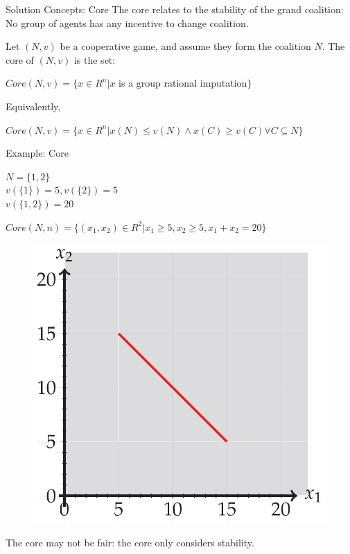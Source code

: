 \documentclass{beamer}
\begin{document}
\begin{frame} {Solution Concepts: Core}
    The core relates to the stability of the grand coalition: \\ No group of agents has any incentive to change coalition.
    \begin{definition}\label{dfn:core}
        Let $(N,v)$ be a cooperative game, and assume they form the coalition $N$. The core of $(N,v)$ is the set:
        \vspace{0.1cm}
        \begin{center}
            $Core(N,v) = \{x \in R^n | x$ is a group rational imputation$\}$
        \end{center}
        Equivalently,
        \vspace{0.1cm}
        \begin{center}
            $Core(N,v) = \{x \in R^n | x(N) \leq v(N) \wedge x(C) \geq v(C) \forall C \subseteq N\}$
        \end{center}
    \end{definition}

\end{frame}
\begin{frame} {Example: Core}

    \begin{center}
      $N = \{1,2\}$ \\
      $v(\{1\}) = 5, v(\{2\}) = 5$ \\
      $v(\{1,2\}) = 20$ \\
    \end{center}

    $Core(N,n) = \{(x_1,x_2) \in R^2 | x_1 \geq 5, x_2 \geq 5, x_1 + x_2 = 20\}$

    \begin{figure}[htbp]
        \centering
        \includegraphics[width=0.3 \columnwidth]{figures/coreex1.png} 
    \end{figure}

    The core may not be fair: the core only considers stability.

\end{frame}
\end{document}
